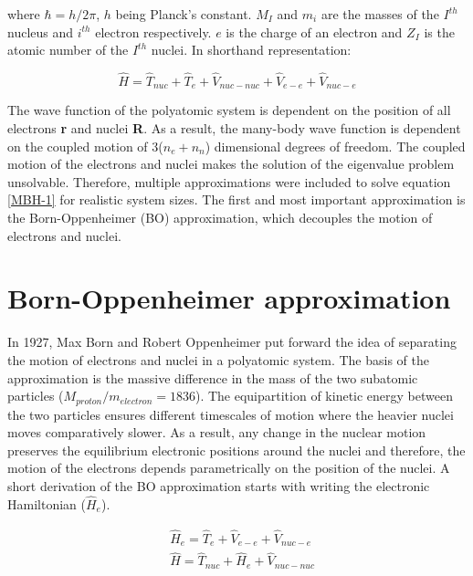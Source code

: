 \noindent where $\hbar=h/2\pi$, $h$ being Planck's constant. $M_I$ and $m_i$ are the masses 
of the $I^{th}$ nucleus and $i^{th}$ electron respectively. $e$ is the charge of an electron
and $Z_I$ is the atomic number of the $I^{th}$ nuclei. In shorthand representation: 
 
 \begin{equation}
     \label{MBH-22}
      \hat{H}=\hat{T}_{nuc}+\hat{T}_{e}+\hat{V}_{nuc-nuc}+\hat{V}_{e-e}+\hat{V}_{nuc-e}
 \end{equation}
 
\noindent The wave function of the polyatomic system is dependent on the position of all electrons {\textbf{r}} and nuclei {\textbf{R}}. As a result, the many-body wave function is dependent on the coupled motion of 3($n_e+n_n$) dimensional degrees of freedom. The coupled motion of the electrons and nuclei makes the solution of the eigenvalue problem unsolvable. Therefore, multiple approximations were included  to solve equation \ref{MBH-1} for realistic system sizes. The first and most important approximation is the Born-Oppenheimer (BO) approximation, which decouples the motion of electrons and nuclei.  

\section{Born-Oppenheimer approximation}
\label{BO_apprx}
 \noindent In 1927, Max Born and Robert Oppenheimer \cite{bo} put forward the idea of separating the motion of electrons and nuclei in a polyatomic system. The basis of the approximation is the massive difference in the mass of the two subatomic particles ($ M _{proton} / m_{electron} = 1836 $). The equipartition of kinetic energy between the two particles ensures different timescales of motion where the heavier nuclei moves comparatively slower. As a result, any change in the nuclear motion preserves the equilibrium electronic positions around the nuclei and therefore, the motion of the electrons depends parametrically on the position of the nuclei. A short derivation of the BO approximation starts with writing the electronic Hamiltonian ($\hat{H}_{e}$). 
 
\begin{align}
      &\hat{H}_{e}=\hat{T}_{e}+\hat{V}_{e-e}+\hat{V}_{nuc-e} \label{BOA-1-1}\\
      &\hat{H}=\hat{T}_{nuc}+\hat{H}_{e}+\hat{V}_{nuc-nuc} \label{BOA-1-2}
\end{align}


